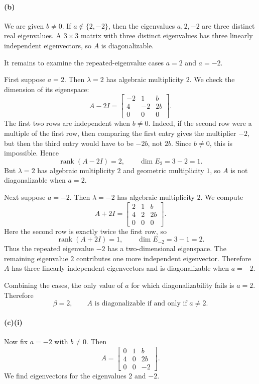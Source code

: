 \documentclass[12pt]{article}
\newcommand{\rank}{\operatorname{rank}}
\begin{document}
\paragraph{(b)}
We are given $b\neq0$. If $a\notin\{2,-2\}$, then the eigenvalues $a,2,-2$ are three distinct real eigenvalues. A $3\times3$ matrix with three distinct eigenvalues has three linearly independent eigenvectors, so $A$ is diagonalizable.

It remains to examine the repeated-eigenvalue cases $a=2$ and $a=-2$.

First suppose $a=2$. Then $\lambda=2$ has algebraic multiplicity $2$. We check the dimension of its eigenspace:
\[
A-2I=
\begin{bmatrix}
-2&1&b\\
4&-2&2b\\
0&0&0
\end{bmatrix}.
\]
The first two rows are independent when $b\neq0$. Indeed, if the second row were a multiple of the first row, then comparing the first entry gives the multiplier $-2$, but then the third entry would have to be $-2b$, not $2b$. Since $b\neq0$, this is impossible. Hence
\[
\rank(A-2I)=2,
\qquad
\dim E_2=3-2=1.
\]
But $\lambda=2$ has algebraic multiplicity $2$ and geometric multiplicity $1$, so $A$ is not diagonalizable when $a=2$.

Next suppose $a=-2$. Then $\lambda=-2$ has algebraic multiplicity $2$. We compute
\[
A+2I=
\begin{bmatrix}
2&1&b\\
4&2&2b\\
0&0&0
\end{bmatrix}.
\]
Here the second row is exactly twice the first row, so
\[
\rank(A+2I)=1,
\qquad
\dim E_{-2}=3-1=2.
\]
Thus the repeated eigenvalue $-2$ has a two-dimensional eigenspace. The remaining eigenvalue $2$ contributes one more independent eigenvector. Therefore $A$ has three linearly independent eigenvectors and is diagonalizable when $a=-2$.

Combining the cases, the only value of $a$ for which diagonalizability fails is $a=2$. Therefore
\[
\boxed{\beta=2,
\qquad
A\text{ is diagonalizable if and only if }a\neq2.}
\]

\paragraph{(c)(i)}
Now fix $a=-2$ with $b\neq0$. Then
\[
A=
\begin{bmatrix}
0&1&b\\
4&0&2b\\
0&0&-2
\end{bmatrix}.
\]
We find eigenvectors for the eigenvalues $2$ and $-2$.
\end{document}
